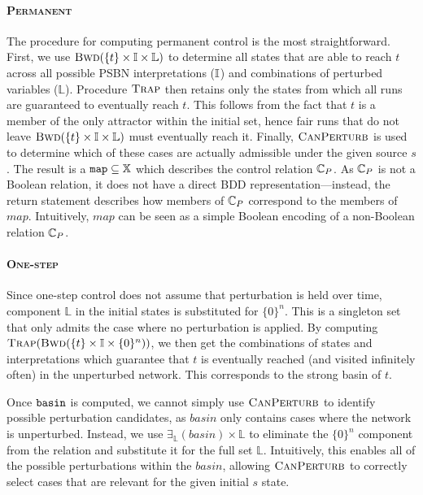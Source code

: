 \paragraph{\textsc{Permanent}} The procedure for computing permanent control is the most straightforward. First, we use $\textsc{Bwd}(\{t\} \times \mathbb{I} \times \mathbb{L})$ to determine all states that are able to reach $t$ across all possible PSBN interpretations ($\mathbb{I}$) and combinations of perturbed variables ($\mathbb{L}$). Procedure $\textsc{Trap}$ then retains only the states from which all runs are guaranteed to eventually reach $t$. This follows from the fact that $t$ is a member of the only attractor within the initial set, hence fair runs that do not leave $\textsc{Bwd}(\{t\} \times \mathbb{I} \times \mathbb{L})$ must eventually reach it. Finally, $\textsc{CanPerturb}$ is used to determine which of these cases are actually admissible under the given source $s$ . The result is a $\texttt{map} \subseteq \mathbb{X}$ which describes the control relation $\mathbb{C}_P$. As $\mathbb{C}_P$ is not a Boolean relation, it does not have a direct BDD representation---instead, the return statement describes how members of $\mathbb{C}_P$ correspond to the members of $map$. Intuitively, $map$ can be seen as a simple Boolean encoding of a non-Boolean relation $\mathbb{C}_P$. 

\paragraph{\textsc{One-step}} Since one-step control does not assume that perturbation is held over time, component $\mathbb{L}$ in the initial states is substituted for $\{ 0 \}^n$. This is a singleton set that only admits the case where no perturbation is applied. By computing $\textsc{Trap}(\textsc{Bwd}(\{t\} \times \mathbb{I} \times \{0\}^n))$, we then get the combinations of states and interpretations which guarantee that $t$ is eventually reached (and visited infinitely often) in the unperturbed network. This corresponds to the strong basin of $t$.

Once $\texttt{basin}$ is computed, we cannot simply use $\textsc{CanPerturb}$ to identify possible perturbation candidates, as $basin$ only contains cases where the network is unperturbed. Instead, we use $\exists_{\mathbb{L}}(basin) \times \mathbb{L}$ to eliminate the $\{0\}^n$ component from the relation and substitute it for the full set $\mathbb{L}$. Intuitively, this enables all of the possible perturbations within the $basin$, allowing $\textsc{CanPerturb}$ to correctly select cases that are relevant for the given initial $s$ state.

